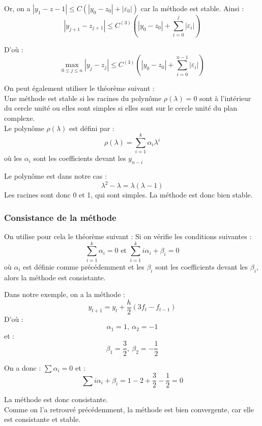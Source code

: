 Or, on a $|y_1-z-1|\leq C(|y_0-z_0| + |\varepsilon_0|)$ car la méthode est stable. Ainsi :
\[|y_{j+1}-z_{j+1}|\leq C^{(3)}\left(|y_0-z_0| + \sum_{i=0}^j |\varepsilon_i|\right)\]

D'où :
\[\max_{0\leq j\leq n} |y_j - z_j| \leq C^{(3)}\left(|y_0-z_0| + \sum_{i=0}^{n-1} |\varepsilon_i|\right)\]

\bigskip
On peut également utiliser le théorème suivant : \\
Une méthode est stable si les racines du polynôme $\rho(\lambda)=0$ sont à l'intérieur du cercle unité ou elles sont simples si elles sont sur le cercle unité du plan complexe.\\
Le polynôme $\rho(\lambda)$ est défini par : \[\rho(\lambda)=\sum_{i=1}^k \alpha_i \lambda^i\]
où les $\alpha_i$ sont les coefficients devant les $y_{n-i}$

\bigskip
Le polynôme est dans notre cas : \[\lambda^2-\lambda=\lambda(\lambda-1)\]
Les racines sont donc 0 et 1, qui sont simples. La méthode est donc bien stable.

\subsubsection{Consistance de la méthode}
On utilise pour cela le théorème suivant :
Si on vérifie les conditions suivantes :
\[\sum_{i=1}^k \alpha_i = 0 \text{ et } \sum_{i=1}^k i\alpha_i + \beta_i =0\]
où $\alpha_i$ est définie comme précédemment et les $\beta_i$ sont les coefficients devant les $\beta_i$, alors la méthode est consistante. 

\bigskip
Dans notre exemple, on a la méthode : 
\[y_{t+1}=y_t + \frac{h}{2}(3f_t - f_{t-1})\]
D'où :
\[\alpha_1 = 1,\ \alpha_2=-1\]
et :
\[\beta_1 = \frac{3}{2},\ \beta_2=-\frac{1}{2}\]

On a donc : $\sum \alpha_i = 0$ et :
\[\sum i\alpha_i + \beta_i = 1-2+\frac{3}{2}-\frac{1}{2} = 0\]

La méthode est donc consistante. \\
Comme on l'a retrouvé précédemment, la méthode est bien convergente, car elle est consistante et stable.
